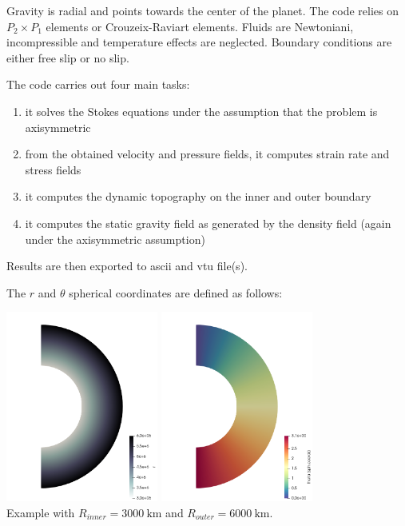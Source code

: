 Gravity is radial and points towards the center of the planet. 
The code relies on $P_2\times P_1$ elements or Crouzeix-Raviart elements. 
Fluids are Newtoniani, incompressible and 
temperature effects are neglected. 
Boundary conditions are either free slip or no slip.

The code carries out four main tasks:
\begin{enumerate}
\item it solves the Stokes equations under the assumption that the problem is axisymmetric
\item from the obtained velocity and pressure fields, it computes strain rate and stress fields
\item it computes the dynamic topography on the inner and outer boundary
\item it computes the static gravity field as generated by the density field (again under the 
axisymmetric assumption)
\end{enumerate}
Results are then exported to ascii and vtu file(s).

The $r$ and $\theta$ spherical coordinates are defined as follows:
\begin{center}
\includegraphics[width=5cm]{python_codes/fieldstone_96/images/radius}
\includegraphics[width=5cm]{python_codes/fieldstone_96/images/theta}\\
{\captionfont Example with $R_{inner}=3000~\si{\km}$ and $R_{outer}=6000~\si{\km}$.}
\end{center}

